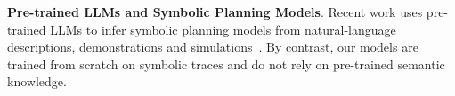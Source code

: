 
\noindent \textbf{Pre-trained LLMs and Symbolic Planning Models}.
Recent work uses pre-trained LLMs to infer symbolic planning models from natural-language descriptions, demonstrations and simulations~\citep{NEURIPS2023_f9f54762,oswald2024large,yu2025symbolic,huang2026onedemo,hao2026simulation,xie-etal-2025-making}.
By contrast, our models are trained from scratch on symbolic traces and do not rely on pre-trained semantic knowledge.



